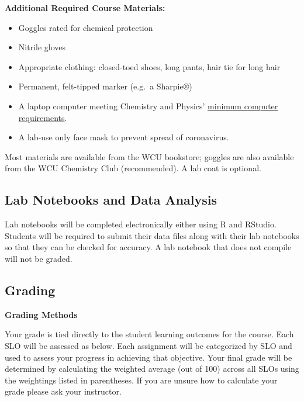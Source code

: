 \documentclass[]{tufte-book}
\providecommand{\tightlist}{%
  \setlength{\itemsep}{0pt}\setlength{\parskip}{0pt}}
\begin{document}
\textbf{Additional Required Course Materials:}

\begin{itemize}
\tightlist
\item
  Goggles rated for chemical protection
\item
  Nitrile gloves
\item
  Appropriate clothing: closed-toed shoes, long pants, hair tie for long hair
\item
  Permanent, felt-tipped marker (e.g.~a Sharpie®)
\item
  A laptop computer meeting Chemistry and Physics' \href{https://www.wcu.edu/learn/academic-services/it/computer-guidelines/index.aspx}{minimum computer requirements}.
\item
  A lab-use only face mask to prevent spread of coronavirus.
\end{itemize}

Most materials are available from the WCU bookstore; goggles are also available from the WCU Chemistry Club (recommended). A lab coat is optional.

\hypertarget{lab-notebooks-and-data-analysis}{%
\subsection*{Lab Notebooks and Data Analysis}\label{lab-notebooks-and-data-analysis}}

Lab notebooks will be completed electronically either using R and RStudio. Students will be required to submit their data files along with their lab notebooks so that they can be checked for accuracy. A lab notebook that does not compile will not be graded.

\hypertarget{grading}{%
\subsection*{Grading}\label{grading}}

\textbf{Grading Methods}

Your grade is tied directly to the student learning outcomes for the course. Each SLO will be assessed as below. Each assignment will be categorized by SLO and used to assess your progress in achieving that objective. Your final grade will be determined by calculating the weighted average (out of 100) across all SLOs using the weightings listed in parentheses. If you are unsure how to calculate your grade please ask your instructor.
\end{document}
